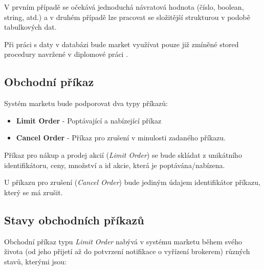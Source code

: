 \documentclass[thesis=M,czech]{FITthesis}[2012/06/26]
\begin{document}
	V prvním případě se očekává jednoduchá návratová hodnota (číslo, boolean, string, atd.) a v druhém případě lze pracovat se složitější strukturou v podobě tabulkových dat.

	Při práci s daty v databázi bude market využívat pouze již zmíněné stored procedury navržené v diplomové práci \cite{Fremunt2014}.
	
\subsection{Obchodní příkaz}
	
	Systém marketu bude podporovat dva typy příkazů:

\begin{itemize}

\item \textbf{Limit Order} - Poptávající a nabízející příkaz
	 
\item \textbf{Cancel Order} - Příkaz pro zrušení v minulosti zadaného příkazu.

\end{itemize}	
	
	Příkaz pro nákup a prodej akcií (\textit{Limit Order}) se bude skládat z unikátního identifikátoru, ceny, množství a id akcie, která je poptávána/nabízena.
	
	U příkazu pro zrušení (\textit{Cancel Order}) bude jediným údajem identifikátor příkazu, který se má zrušit.
	
\subsection{Stavy obchodních příkazů}

	Obchodní příkaz typu \textit{Limit Order} nabývá v systému marketu během svého života (od jeho přijetí až do potvrzení notifikace o vyřízení brokerem) různých stavů, kterými jsou:
\end{document}
